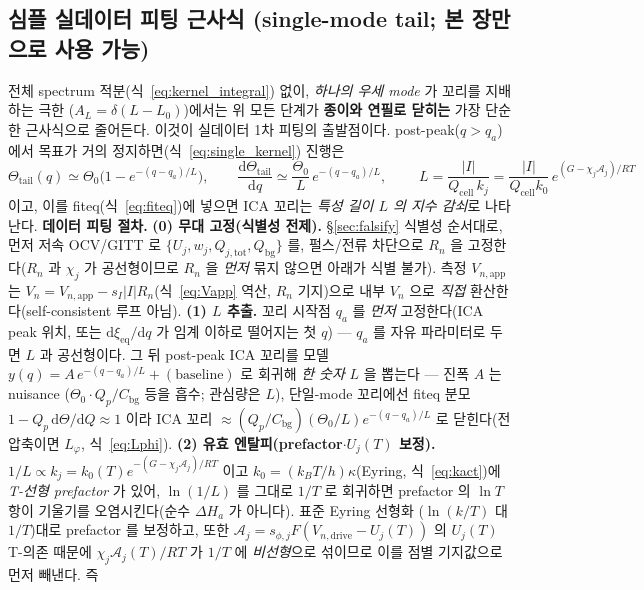 \documentclass[11pt,a4paper]{article}
\newcommand{\dd}{\mathrm{d}}
\newcommand{\eq}{\mathrm{eq}}
\newcommand{\app}{\mathrm{app}}
\newcommand{\drive}{\mathrm{drive}}
\newcommand{\bg}{\mathrm{bg}}
\newcommand{\cell}{\mathrm{cell}}
\newcommand{\tot}{\mathrm{tot}}
\begin{document}
\subsection{심플 실데이터 피팅 근사식 (single-mode tail; 본 장만으로 사용 가능)}\label{sec:ch1_simplefit}
전체 spectrum 적분(식~\eqref{eq:kernel_integral}) 없이, \emph{하나의 우세 mode} 가 꼬리를 지배하는 극한
($A_L=\delta(L-L_0)$)에서는 위 모든 단계가 \textbf{종이와 연필로 닫히는} 가장 단순한 근사식으로 줄어든다. 이것이
실데이터 1차 피팅의 출발점이다. post-peak($q>q_a$) 에서 목표가 거의 정지하면(식~\eqref{eq:single_kernel}) 진행은
\begin{equation}
\Theta_\mathrm{tail}(q)\simeq\Theta_0\Big(1-e^{-(q-q_a)/L}\Big),\qquad
\frac{\dd\Theta_\mathrm{tail}}{\dd q}\simeq\frac{\Theta_0}{L}\,e^{-(q-q_a)/L},\qquad
\boxed{\;L=\frac{|I|}{Q_\cell\,k_j}=\frac{|I|}{Q_\cell k_0}\,e^{(G-\chi_j\mathcal A_j)/RT}\;}
\label{eq:simplefit}
\end{equation}
이고, 이를 fiteq(식~\eqref{eq:fiteq})에 넣으면 ICA 꼬리는 \emph{특성 길이 $L$ 의 지수 감쇠}로 나타난다.
\textbf{데이터 피팅 절차.}
\textbf{(0) 무대 고정(식별성 전제).} \S\ref{sec:falsify} 식별성 순서대로, 먼저 저속 OCV/GITT 로
$\{U_j,w_j,Q_{j,\tot},Q_\bg\}$ 를, 펄스/전류 차단으로 $R_n$ 을 고정한다($R_n$ 과 $\chi_j$ 가 공선형이므로 $R_n$ 을
\emph{먼저} 묶지 않으면 아래가 식별 불가). 측정 $V_{n,\app}$ 는 $V_n=V_{n,\app}-s_I|I|R_n$(식~\eqref{eq:Vapp} 역산,
$R_n$ 기지)으로 내부 $V_n$ 으로 \emph{직접} 환산한다(self-consistent 루프 아님).
\textbf{(1) $L$ 추출.} 꼬리 시작점 $q_a$ 를 \emph{먼저} 고정한다(ICA peak 위치, 또는 $\dd\xi_{\eq}/\dd q$ 가 임계
이하로 떨어지는 첫 $q$) — $q_a$ 를 자유 파라미터로 두면 $L$ 과 공선형이다. 그 뒤 post-peak ICA 꼬리를
모델 $y(q)=A\,e^{-(q-q_a)/L}+(\text{baseline})$ 로 회귀해 \emph{한 숫자} $L$ 을 뽑는다 — 진폭 $A$ 는 nuisance
($\Theta_0\cdot Q_p/C_\bg$ 등을 흡수; 관심량은 $L$), 단일-mode 꼬리에선 fiteq 분모 $1-Q_p\,\dd\Theta/\dd Q\!\approx\!1$
이라 ICA 꼬리 $\approx(Q_p/C_\bg)(\Theta_0/L)e^{-(q-q_a)/L}$ 로 닫힌다(전압축이면 $L_\varphi$, 식~\eqref{eq:Lphi}).
\textbf{(2) 유효 엔탈피(prefactor$\cdot U_j(T)$ 보정).} $1/L\propto k_j=k_0(T)e^{-(G-\chi_j\mathcal A_j)/RT}$ 이고
$k_0=(k_BT/h)\kappa$(Eyring, 식~\eqref{eq:kact})에 \emph{T-선형 prefactor} 가 있어, $\ln(1/L)$ 를 그대로
$1/T$ 로 회귀하면 prefactor 의 $\ln T$ 항이 기울기를 오염시킨다(순수 $\Delta H_a$ 가 아니다). 표준 Eyring 선형화
($\ln(k/T)$ 대 $1/T$)대로 prefactor 를 보정하고, 또한 $\mathcal A_j=s_{\phi,j}F(V_{n,\drive}-U_j(T))$ 의 $U_j(T)$
T-의존 때문에 $\chi_j\mathcal A_j(T)/RT$ 가 $1/T$ 에 \emph{비선형}으로 섞이므로 이를 점별 기지값으로 먼저 빼낸다. 즉
\end{document}
